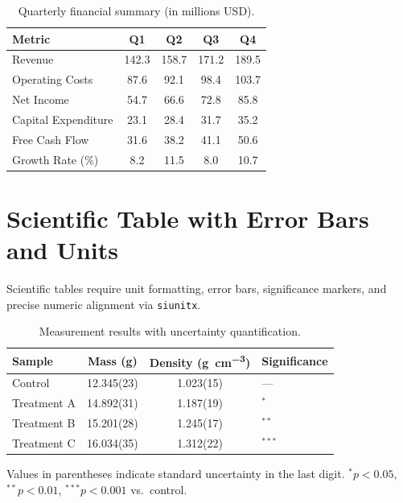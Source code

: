 \documentclass[
    language=english,
    doctype=article,
    institution=none,
]{../../omnilatex}
\begin{document}
\begin{table}[htbp]
    \centering
    \caption{Quarterly financial summary (in millions USD).}
    \label{tab:financial}
    \begin{tabular}{l S[table-format=3.1] S[table-format=3.1] S[table-format=3.1] S[table-format=3.1]}
        \toprule
        \textbf{Metric} & {Q1} & {Q2} & {Q3} & {Q4} \\
        \midrule
        Revenue            & 142.3 & 158.7 & 171.2 & 189.5 \\
        Operating Costs    & 87.6  & 92.1  & 98.4  & 103.7 \\
        Net Income         & 54.7  & 66.6  & 72.8  & 85.8  \\
        Capital Expenditure & 23.1 & 28.4  & 31.7  & 35.2  \\
        Free Cash Flow     & 31.6  & 38.2  & 41.1  & 50.6  \\
        \midrule
        Growth Rate (\%)   & 8.2   & 11.5  & 8.0   & 10.7  \\
        \bottomrule
    \end{tabular}
\end{table}

\section{Scientific Table with Error Bars and Units}
\label{sec:scientific}

Scientific tables require unit formatting, error bars, significance markers, and
precise numeric alignment via \texttt{siunitx}.

\begin{table}[htbp]
    \centering
    \caption{Measurement results with uncertainty quantification.}
    \label{tab:scientific}
    \begin{tabular}{l S[table-format=2.3(3)] S[table-format=2.3(3)] l}
        \toprule
        \textbf{Sample} & {Mass (g)} & {Density (\unit{g\per cm^3})} & \textbf{Significance} \\
        \midrule
        Control   & 12.345(23) & 1.023(15) & ---       \\
        Treatment A & 14.892(31) & 1.187(19) & $^{*}$   \\
        Treatment B & 15.201(28) & 1.245(17) & $^{**}$  \\
        Treatment C & 16.034(35) & 1.312(22) & $^{***}$ \\
        \bottomrule
    \end{tabular}

    \vspace{0.5em}
    \footnotesize
    Values in parentheses indicate standard uncertainty in the last digit.
    $^{*}p < 0.05$, $^{**}p < 0.01$, $^{***}p < 0.001$ vs.\ control.
\end{table}
\end{document}
